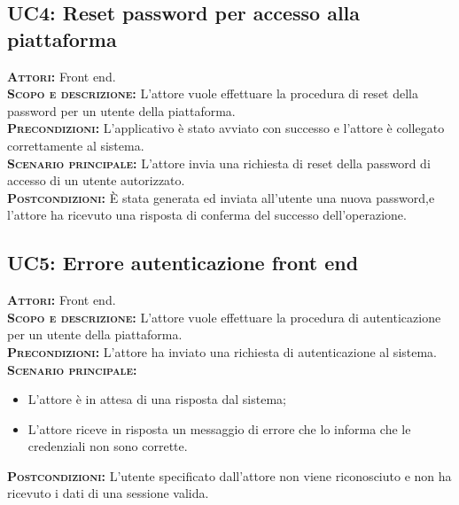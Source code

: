 \subsection{UC4: Reset password per accesso alla piattaforma}
\label{sec:uc4}
\textsc{\textbf{Attori:}} Front end.\\
\textsc{\textbf{Scopo e descrizione:}} L'attore vuole effettuare la procedura di reset della password per un utente della piattaforma.\\
\textsc{\textsc{\textbf{Precondizioni:}}} L'applicativo è stato avviato con successo e l'attore è collegato correttamente al sistema.\\
\textsc{\textbf{Scenario principale:}} L'attore invia una richiesta di reset della password di accesso di un utente autorizzato.\\
\textsc{\textbf{Postcondizioni:}} È stata generata ed inviata all'utente una nuova password,e l'attore ha ricevuto una risposta di conferma del successo dell'operazione.

\subsection{UC5: Errore autenticazione front end}
\label{sec:UC5}
\textsc{\textbf{Attori:}} Front end.\\
\textsc{\textbf{Scopo e descrizione:}} L'attore vuole effettuare la procedura di autenticazione per un utente della piattaforma.\\
\textsc{\textsc{\textbf{Precondizioni:}}} L'attore ha inviato una richiesta di autenticazione al sistema.\\
\textsc{\textbf{Scenario principale:}} 
\begin{itemize}
    \item L'attore è in attesa di una risposta dal sistema;
    \item L'attore riceve in risposta un messaggio di errore che lo informa che le credenziali non sono corrette.
\end{itemize}
\textsc{\textbf{Postcondizioni:}} L'utente specificato dall'attore non viene riconosciuto e non ha ricevuto i dati di una sessione valida.

